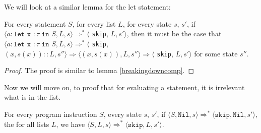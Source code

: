 We will look at a similar lemma for the let statement:

\begin{lemma}
\label{breakingdownlet}
For every statement $S$, for every list $L$, for every state $s$, $s'$, if $\langle a : \texttt{let x } : \tau \texttt{ in } S , L, s \rangle \Rightarrow ^{*} \langle$ \texttt{skip}, $L, s' \rangle$, then it must be the case that $\langle a : \texttt{let x } : \tau \texttt{ in } S, L, s \rangle \Rightarrow ^{*} \langle$ \texttt{skip}, $(x,s(x))::L, s'' \rangle \Rightarrow \langle (x,s(x)), L, s'' \rangle \Rightarrow \langle$ \texttt{skip}, $L, s' \rangle$ for some state $s''$. 
\end{lemma}

\begin{proof}
The proof is similar to lemma \ref{breakingdowncomp}. 
\end{proof}

Now we will move on, to proof that for evaluating a statement, it is irrelevant what is in the list. 

\begin{proposition}
For every program instruction $S$, every state $s$, $s'$, if $\langle S, \texttt{Nil}, s \rangle \Rightarrow ^{*} \langle \texttt{skip}, \texttt{Nil}, s' \rangle$, the for all lists $L$, we have $\langle S, L, s \rangle \Rightarrow ^{*} \langle \texttt{skip}, L, s' \rangle$. 
\end{proposition}


